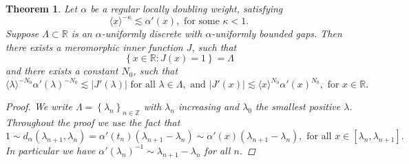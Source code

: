 \documentclass{article}[12pt]
\newtheorem{theorem}{Theorem}
\theoremstyle{remark}
\begin{document}
    \begin{theorem}\label{thm:construction_inner_function}
        Let $\alpha$ be a regular locally doubling weight, satisfying
        \begin{equation*}
                \langle x\rangle^{-\kappa} \lesssim \alpha'(x), \text{ for some } \kappa < 1.
        \end{equation*}
        Suppose $\Lambda \subset \mathbb{R}$ is an $\alpha$-uniformly discrete with $\alpha$-uniformly bounded gaps. Then there exists a meromorphic inner function $J$, such that
        \begin{equation*}
            \left\{ x \in \mathbb{R} : J(x) = 1 \right\} =\Lambda
        \end{equation*}
        and there exists a constant $N_{0}$, such that
        \begin{equation*}
            \langle \lambda \rangle^{-N_{0}}\alpha'(\lambda)^{-N_{0}} \lesssim \lvert J'(\lambda) \rvert \text{ for all } \lambda \in \Lambda, \text{ and } \lvert J'(x) \rvert \lesssim \langle x \rangle^{N_{0}}\alpha'(x)^{N_{0}}, \text{ for }x \in \mathbb{R}.
        \end{equation*}
        \begin{proof}
            We write $\Lambda = \left\{ \lambda_{n}\right\}_{n\in \mathbb{Z}}$ with $\lambda_{n}$ increasing and $\lambda_{0}$ the smallest positive $\lambda$. Throughout the proof we use the fact that
            \begin{equation*}
                1 \sim d_{\alpha}(\lambda_{n+1}, \lambda_{n}) = \alpha'(t_{n})(\lambda_{n+1}-\lambda_{n}) \sim \alpha'(x)(\lambda_{n+1}-\lambda_{n}), \text{ for all } x \in [\lambda_{n},\lambda_{n+1}].
            \end{equation*}
            In particular we have $\alpha'(\lambda_{n})^{-1} \sim \lambda_{n+1}-\lambda_{n}$ for all $n$.\newline
            

\end{proof}
\end{theorem}
\end{document}
